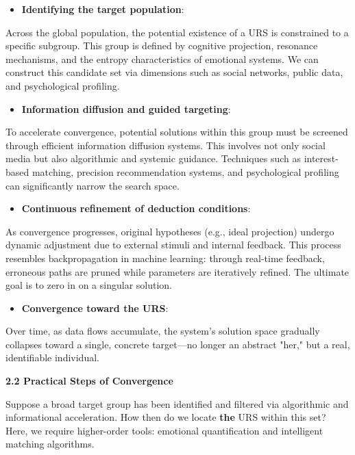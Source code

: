 \documentclass[
]{article}
\begin{document}
\begin{itemize}
\item
  \textbf{Identifying the target population}:
\end{itemize}

Across the global population, the potential existence of a URS is
constrained to a specific subgroup. This group is defined by cognitive
projection, resonance mechanisms, and the entropy characteristics of
emotional systems. We can construct this candidate set via dimensions
such as social networks, public data, and psychological profiling.

\begin{itemize}
\item
  \textbf{Information diffusion and guided targeting}:
\end{itemize}

To accelerate convergence, potential solutions within this group must be
screened through efficient information diffusion systems. This involves
not only social media but also algorithmic and systemic guidance.
Techniques such as interest-based matching, precision recommendation
systems, and psychological profiling can significantly narrow the search
space.

\begin{itemize}
\item
  \textbf{Continuous refinement of deduction conditions}:
\end{itemize}

As convergence progresses, original hypotheses (e.g., ideal projection)
undergo dynamic adjustment due to external stimuli and internal
feedback. This process resembles backpropagation in machine learning:
through real-time feedback, erroneous paths are pruned while parameters
are iteratively refined. The ultimate goal is to zero in on a singular
solution.

\begin{itemize}
\item
  \textbf{Convergence toward the URS}:
\end{itemize}

Over time, as data flows accumulate, the system's solution space
gradually collapses toward a single, concrete target---no longer an
abstract "her," but a real, identifiable individual.

\textbf{2.2 Practical Steps of Convergence}

Suppose a broad target group has been identified and filtered via
algorithmic and informational acceleration. How then do we locate
\textbf{the} URS within this set? Here, we require higher-order tools:
emotional quantification and intelligent matching algorithms.
\end{document}
